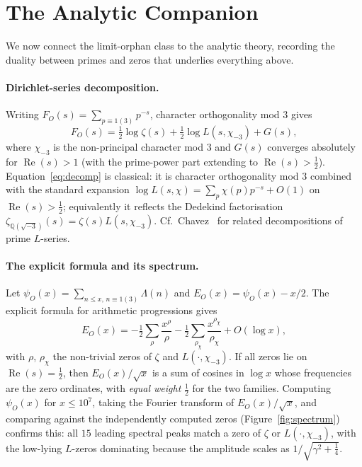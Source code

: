 \documentclass[11pt]{article}
\theoremstyle{plain}
\theoremstyle{definition}
\theoremstyle{remark}
\newcommand{\Q}{\mathbb{Q}}
\newcommand{\re}{\operatorname{Re}}
\begin{document}
\section{The Analytic Companion}

We now connect the limit-orphan class to the analytic theory, recording the
duality between primes and zeros that underlies everything above.

\paragraph{Dirichlet-series decomposition.}
Writing $F_O(s)=\sum_{p\equiv 1(3)}p^{-s}$, character orthogonality mod $3$ gives
\begin{equation}\label{eq:decomp}
F_O(s) = \tfrac12\log\zeta(s) + \tfrac12\log L(s,\chi_{-3}) + G(s),
\end{equation}
where $\chi_{-3}$ is the non-principal character mod $3$ and $G(s)$ converges
absolutely for $\re(s)>1$ (with the prime-power part extending to
$\re(s)>\tfrac12$). Equation~\eqref{eq:decomp} is classical: it is character
orthogonality mod $3$ combined with the standard expansion
$\log L(s,\chi)=\sum_p\chi(p)p^{-s}+O(1)$ on $\re(s)>\tfrac12$; equivalently it
reflects the Dedekind factorisation
$\zeta_{\Q(\sqrt{-3})}(s)=\zeta(s)L(s,\chi_{-3})$. Cf.\
Chavez~\cite{Chavez2023} for related decompositions of prime $L$-series.

\paragraph{The explicit formula and its spectrum.}
Let $\psi_O(x)=\sum_{n\le x,\,n\equiv 1(3)}\Lambda(n)$ and
$E_O(x)=\psi_O(x)-x/2$. The explicit formula for arithmetic progressions gives
\[
E_O(x) = -\tfrac12\sum_{\rho}\frac{x^\rho}{\rho}
         -\tfrac12\sum_{\rho_\chi}\frac{x^{\rho_\chi}}{\rho_\chi} + O(\log x),
\]
with $\rho$, $\rho_\chi$ the non-trivial zeros of $\zeta$ and $L(\cdot,\chi_{-3})$.
If all zeros lie on $\re(s)=\tfrac12$, then $E_O(x)/\sqrt{x}$ is a sum of cosines
in $\log x$ whose frequencies are the zero ordinates, with \emph{equal weight}
$\tfrac12$ for the two families. Computing $\psi_O(x)$ for $x\le 10^7$, taking the
Fourier transform of $E_O(x)/\sqrt{x}$, and comparing against the independently
computed zeros (Figure~\ref{fig:spectrum}) confirms this: all $15$ leading
spectral peaks match a zero of $\zeta$ or $L(\cdot,\chi_{-3})$, with the
low-lying $L$-zeros dominating because the amplitude scales as
$1/\sqrt{\gamma^2+\tfrac14}$.
\end{document}
